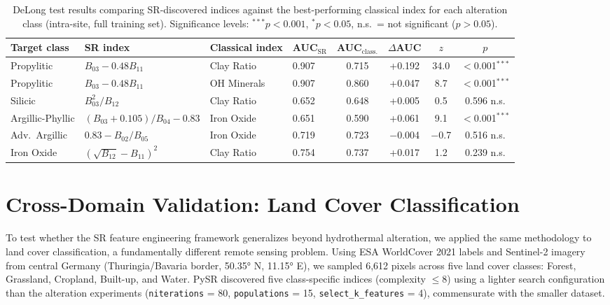 \documentclass[review,authoryear]{elsarticle}
\begin{document}
\begin{table}[ht]
\centering
\caption{DeLong test results comparing SR-discovered indices against the best-performing classical index for each alteration class (intra-site, full training set). Significance levels: $^{***}p<0.001$, $^{*}p<0.05$, n.s.\ = not significant ($p > 0.05$).}
\label{tab:s_delong}
\begin{tabular}{llllcccc}
\toprule
Target class & SR index & Classical index & AUC$_{\text{SR}}$ & AUC$_{\text{class.}}$ & $\Delta$AUC & $z$ & $p$ \\
\midrule
Propylitic & $B_{03} - 0.48 B_{11}$ & Clay Ratio & 0.907 & 0.715 & +0.192 & 34.0 & $<$0.001$^{***}$ \\
Propylitic & $B_{03} - 0.48 B_{11}$ & OH Minerals & 0.907 & 0.860 & +0.047 & 8.7 & $<$0.001$^{***}$ \\
Silicic & $B_{03}^2/B_{12}$ & Clay Ratio & 0.652 & 0.648 & +0.005 & 0.5 & 0.596 n.s. \\
Argillic-Phyllic & $(B_{03}+0.105)/B_{04}-0.83$ & Iron Oxide & 0.651 & 0.590 & +0.061 & 9.1 & $<$0.001$^{***}$ \\
Adv.\ Argillic & $0.83 - B_{02}/B_{05}$ & Iron Oxide & 0.719 & 0.723 & $-$0.004 & $-$0.7 & 0.516 n.s. \\
Iron Oxide & $(\sqrt{B_{12}}-B_{11})^2$ & Clay Ratio & 0.754 & 0.737 & +0.017 & 1.2 & 0.239 n.s. \\
\bottomrule
\end{tabular}
\end{table}

\section*{Cross-Domain Validation: Land Cover Classification}
\label{sec:s_landcover}

To test whether the SR feature engineering framework generalizes beyond hydrothermal alteration, we applied the same methodology to land cover classification, a fundamentally different remote sensing problem. Using ESA WorldCover 2021 labels \citep{Zanaga2022} and Sentinel-2 imagery from central Germany (Thuringia/Bavaria border, \ang{50.35} N, \ang{11.15} E), we sampled 6{,}612 pixels across five land cover classes: Forest, Grassland, Cropland, Built-up, and Water. PySR discovered five class-specific indices (complexity $\leq 8$) using a lighter search configuration than the alteration experiments (\texttt{niterations} = 80, \texttt{populations} = 15, \texttt{select\_k\_features} = 4), commensurate with the smaller dataset.
\end{document}
